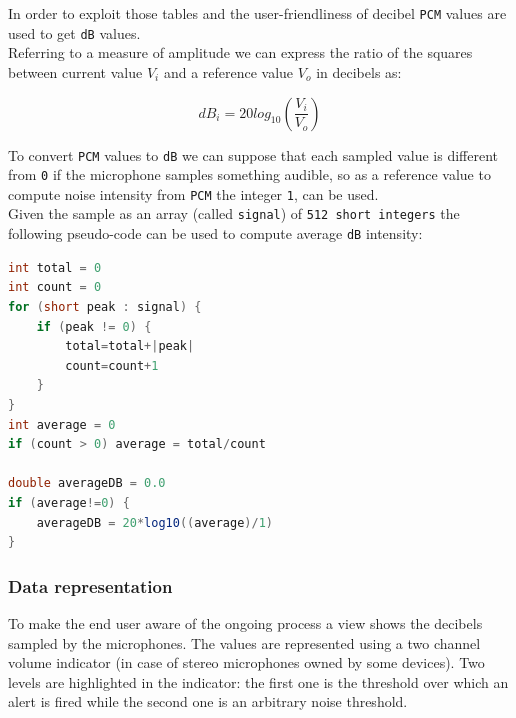 \documentclass[conference, 11pt]{IEEEtran}
\begin{document}
In order to exploit those tables and the user-friendliness of decibel \texttt{PCM} values are used to get \texttt{dB} values.\\ 
Referring to a measure of amplitude we can express the ratio of the squares between current value $V_i$ and a reference value $V_o$ in decibels as:

\begin{equation}
dB_i = 20log_{10} \left(\frac{V_i}{V_o}\right)
\end{equation}

To convert \texttt{PCM} values to \texttt{dB} we can suppose that each sampled value is different from \texttt{0} if the microphone samples something audible, so as a reference value to compute noise intensity from \texttt{PCM} the integer \texttt{1}, can be used.\\

Given the sample as an array (called \texttt{signal}) of \texttt{512 short integers} the following pseudo-code can be used to compute average \texttt{dB} intensity:

\begin{lstlisting}[language=Java, caption=Pseudocode for computing dB from PCM samples]
int total = 0
int count = 0
for (short peak : signal) {
	if (peak != 0) {
		total=total+|peak|
		count=count+1
	}
}
int average = 0
if (count > 0) average = total/count

double averageDB = 0.0
if (average!=0) {
	averageDB = 20*log10((average)/1)
}
\end{lstlisting}

\subsubsection{\textbf{Data representation}}

To make the end user aware of the ongoing process a view shows the decibels sampled by the microphones. The values are represented using a two channel volume indicator (in case of stereo microphones owned by some devices). Two levels are highlighted in the indicator: the first one is the threshold over which an alert is fired while the second one is an arbitrary noise threshold.
\end{document}
